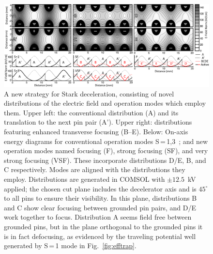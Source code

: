 \documentclass[%
 reprint,
 amsmath,amssymb,
 aps,
prl,
]{revtex4-1}
\begin{document}
\begin{figure}[t!]
\includegraphics[width=\linewidth]{Configurations/pinpairformal6.png}%
\caption{
A new strategy for Stark deceleration, consisting of novel distributions of the electric field and operation modes which employ them. 
Upper left: the conventional distribution (A) and its translation to the next pin pair (A'). 
Upper right: distributions featuring enhanced transverse focusing (B--E). 
Below: On-axis energy diagrams for conventional operation modes S\,=\,1,3~\cite{VanDeMeerakker2005a}; and new operation modes named focusing (F), strong focusing (SF), and very strong focusing (VSF). 
These incorporate distributions D/E, B, and C respectively.  
Modes are aligned with the distributions they employ. 
Distributions are generated in COMSOL with $\pm12.5$~kV applied; the chosen cut plane includes the decelerator axis and is $45^\circ$ to all pins to ensure their visibility.
In this plane, distributions B and C show clear focusing between grounded pin pairs, and D/E work together to focus.
Distribution A seems field free between grounded pins, but in the plane orthogonal to the grounded pins it is in fact defocusing, as evidenced by the traveling potential well generated by S\,=\,1 mode in Fig.~\ref{fig:efftrap}. \vspace{-4mm}
}
\label{fig:chargecartoon}
\end{figure}
\end{document}
